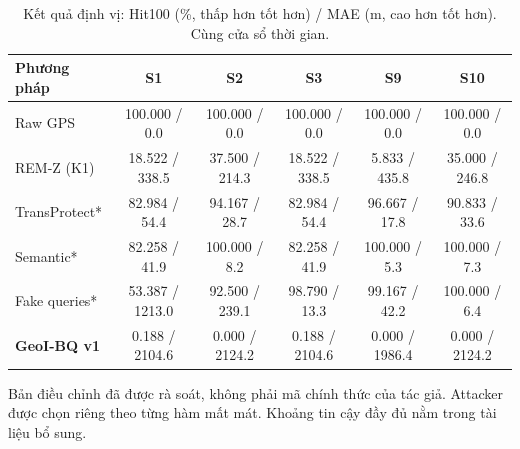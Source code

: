 \begin{table}[t]\centering\footnotesize
\caption{Kết quả định vị: Hit100 (\%, thấp hơn tốt hơn) / MAE (m, cao hơn tốt hơn). Cùng cửa sổ thời gian.}\label{tab:privacy}
\begin{tabularx}{\linewidth}{@{}P{2.7cm}CCCCC@{}}\toprule
\textbf{Phương pháp} & \textbf{S1} & \textbf{S2} & \textbf{S3} & \textbf{S9} & \textbf{S10} \\
\midrule
Raw GPS & 100.000 / 0.0 & 100.000 / 0.0 & 100.000 / 0.0 & 100.000 / 0.0 & 100.000 / 0.0 \\
REM-Z (K1) & 18.522 / 338.5 & 37.500 / 214.3 & 18.522 / 338.5 & 5.833 / 435.8 & 35.000 / 246.8 \\
TransProtect* & 82.984 / 54.4 & 94.167 / 28.7 & 82.984 / 54.4 & 96.667 / 17.8 & 90.833 / 33.6 \\
Semantic* & 82.258 / 41.9 & 100.000 / 8.2 & 82.258 / 41.9 & 100.000 / 5.3 & 100.000 / 7.3 \\
Fake queries* & 53.387 / 1213.0 & 92.500 / 239.1 & 98.790 / 13.3 & 99.167 / 42.2 & 100.000 / 6.4 \\
\textbf{GeoI-BQ v1} & 0.188 / 2104.6 & 0.000 / 2124.2 & 0.188 / 2104.6 & 0.000 / 1986.4 & 0.000 / 2124.2 \\
\bottomrule\end{tabularx}
\par\smallskip\raggedright * Bản điều chỉnh đã được rà soát, không phải mã chính thức của tác giả. Attacker được chọn riêng theo từng hàm mất mát. Khoảng tin cậy đầy đủ nằm trong tài liệu bổ sung.
\end{table}
